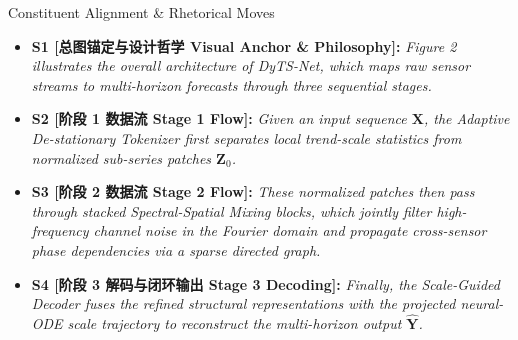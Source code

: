 \begin{TipBox}{Constituent Alignment \& Rhetorical Moves}
\begin{itemize}[leftmargin=1.5em]
  \item \textbf{S1 [总图锚定与设计哲学 Visual Anchor \& Philosophy]:} \textit{Figure 2 illustrates the overall architecture of DyTS-Net, which maps raw sensor streams to multi-horizon forecasts through three sequential stages.}\par{}
  \item \textbf{S2 [阶段 1 数据流 Stage 1 Flow]:} \textit{Given an input sequence $\mathbf{X}$, the Adaptive De-stationary Tokenizer first separates local trend-scale statistics from normalized sub-series patches $\mathbf{Z}_0$.}\par{}
  \item \textbf{S3 [阶段 2 数据流 Stage 2 Flow]:} \textit{These normalized patches then pass through stacked Spectral-Spatial Mixing blocks, which jointly filter high-frequency channel noise in the Fourier domain and propagate cross-sensor phase dependencies via a sparse directed graph.}\par{}
  \item \textbf{S4 [阶段 3 解码与闭环输出 Stage 3 Decoding]:} \textit{Finally, the Scale-Guided Decoder fuses the refined structural representations with the projected neural-ODE scale trajectory to reconstruct the multi-horizon output $\hat{\mathbf{Y}}$.}\par{}
\end{itemize}
\end{TipBox}
\bigskip